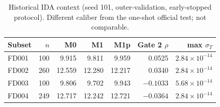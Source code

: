 \begin{table}[t]
\centering
\caption{Historical IDA context (seed 101, outer-validation, early-stopped protocol). Different caliber from the one-shot official test; not comparable.}
\label{tab:context}
\begin{tabular}{lrrrrrr}
\toprule
Subset & $n$ & M0 & M1 & M1p & Gate 2 $\rho$ & max $\sigma_T$ \\
\midrule
FD001 & 100 & 9.915 & 9.811 & 9.959 & 0.0525 & $2.84\times10^{-14}$ \\
FD002 & 260 & 12.559 & 12.280 & 12.217 & 0.0340 & $2.84\times10^{-14}$ \\
FD003 & 100 & 9.806 & 9.702 & 9.943 & $-0.1033$ & $5.68\times10^{-14}$ \\
FD004 & 249 & 12.717 & 12.242 & 12.721 & $-0.0364$ & $2.84\times10^{-14}$ \\
\bottomrule
\end{tabular}
\end{table}
